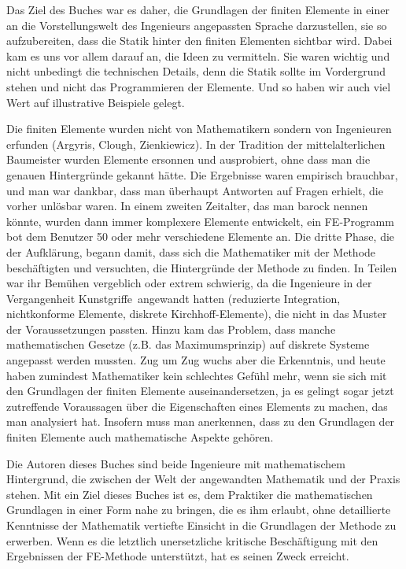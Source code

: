 Das Ziel des Buches war es daher, die Grundlagen der finiten Elemente in einer an die
Vorstellungswelt des Ingenieurs angepassten Sprache darzustellen, sie so
aufzubereiten, dass die Statik hinter den finiten Elementen sichtbar wird. Dabei kam es
uns vor allem darauf an, die Ideen zu vermitteln. Sie waren wichtig und nicht unbedingt
die technischen Details, denn die Statik sollte im Vordergrund stehen und nicht das
Programmieren der Elemente. Und so haben wir auch viel Wert auf illustrative Beispiele gelegt.

Die finiten Elemente wurden nicht von Mathematikern sondern von Ingenieuren erfunden
(Argyris, Clough, Zienkiewicz). In der Tradition der mittelalterlichen Baumeister wurden
Elemente ersonnen und ausprobiert, ohne dass man die genauen Hintergr\"{u}nde gekannt h\"{a}tte.
Die Ergebnisse waren empirisch brauchbar, und man war dankbar, dass man \"{u}berhaupt
Antworten auf Fragen erhielt, die vorher unl\"{o}sbar waren. In einem zweiten Zeitalter, das
man barock nennen k\"{o}nnte, wurden dann immer komplexere Elemente entwickelt, ein
FE-Programm bot dem Benutzer 50 oder mehr verschiedene Elemente an. Die dritte Phase,
die der Aufkl\"{a}rung, begann damit, dass sich die Mathematiker mit der Methode
besch\"{a}ftigten und versuchten, die Hintergr\"{u}nde der Methode zu finden. In Teilen war ihr
Bem\"{u}hen vergeblich oder extrem schwierig, da die Ingenieure in der Vergangenheit \hlq
Kunstgriffe\grq\, angewandt hatten (reduzierte Integration, nichtkonforme Elemente,
diskrete Kirchhoff-Elemente), die nicht in das Muster der Voraussetzungen passten. Hinzu
kam das Problem, dass manche mathematischen Gesetze (z.B. das Maximumsprinzip) auf
diskrete Systeme angepasst werden mussten. Zug um Zug wuchs aber die Erkenntnis, und
heute haben zumindest Mathematiker kein schlechtes Gef\"{u}hl mehr, wenn sie sich mit den
Grundlagen der finiten Elemente auseinandersetzen, ja es gelingt sogar jetzt zutreffende
Voraussagen \"{u}ber die Eigenschaften eines Elements zu machen, das man analysiert hat.
Insofern muss man anerkennen, dass zu den Grundlagen der finiten Elemente auch
mathematische Aspekte geh\"{o}ren.

Die Autoren dieses Buches sind beide Ingenieure mit mathematischem Hintergrund, die
zwischen der Welt der angewandten Mathematik und der Praxis stehen. Mit ein Ziel dieses
Buches ist es, dem Praktiker die mathematischen Grundlagen in einer Form nahe zu
bringen, die es ihm erlaubt, ohne detaillierte Kenntnisse der Mathematik vertiefte Einsicht in die
Grundlagen der Methode zu erwerben. Wenn es die letztlich unersetzliche kritische
Besch\"{a}ftigung mit den Ergebnissen der FE-Methode unterst\"{u}tzt, hat es seinen Zweck
erreicht.

